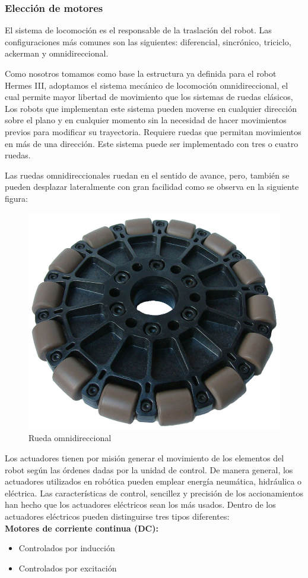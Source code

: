 \subsubsection{Elección de motores}

El sistema de locomoción es el responsable de la traslación del robot. Las configuraciones más comunes son las siguientes: diferencial, sincrónico, triciclo, ackerman y omnidireccional.

Como nosotros tomamos como base la estructura ya definida para el robot Hermes III, adoptamos el sistema mecánico de locomoción omnidireccional, el cual permite mayor libertad de movimiento que los sistemas de ruedas clásicos, Los robots que implementan este sistema pueden moverse en cualquier dirección sobre el plano y en cualquier momento sin la necesidad de hacer movimientos previos para modificar su trayectoria. Requiere ruedas que permitan movimientos en más de una dirección. Este sistema puede ser implementado con tres o cuatro ruedas.

Las ruedas omnidireccionales ruedan en el sentido de avance, pero, también se pueden desplazar lateralmente con gran facilidad como se observa en la siguiente figura:

\begin{figure}[H]
    \centering
    \includegraphics[width=0.25\linewidth]{images/omni-wheel-wikipedia.png}
    \caption{Rueda omnidireccional}
    \label{fig:rueda_omnidireccional}
\end{figure}

Los actuadores tienen por misión generar el movimiento de los elementos del robot según las órdenes dadas por la unidad de control. De manera general, los actuadores utilizados en robótica pueden emplear energía neumática, hidráulica o eléctrica. Las características de control, sencillez y precisión de los accionamientos han hecho que los actuadores eléctricos sean los más usados. Dentro de los actuadores eléctricos pueden distinguirse tres tipos diferentes: \\

\textbf{Motores de corriente continua (DC):}
\begin{itemize}
   \item Controlados por inducción
   \item Controlados por excitación
\end{itemize}

